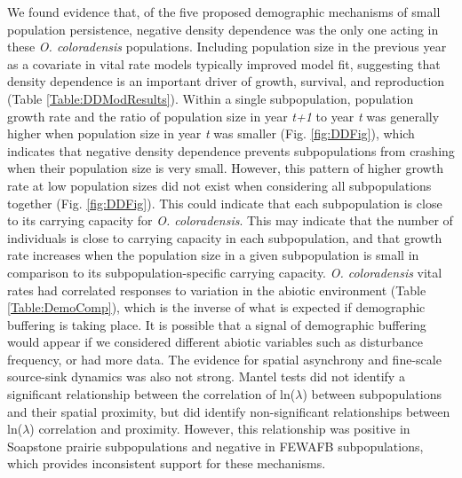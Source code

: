 \documentclass[12pt, letterpaper]{article}
\begin{document}
We found evidence that, of the five proposed demographic mechanisms of small population persistence, negative density dependence was the only one acting in these \textit{O. coloradensis} populations. Including population size in the previous year as a covariate in vital rate models typically improved model fit, suggesting that density dependence is an important driver of growth, survival, and reproduction (Table \ref{Table:DDModResults}). Within a single subpopulation, population growth rate and the ratio of population size in year \textit{t+1} to year \textit{t} was generally higher when population size in year \textit{t} was smaller (Fig. \ref{fig:DDFig}), which indicates that negative density dependence prevents subpopulations from crashing when their population size is very small.  However, this pattern of higher growth rate at low population sizes did not exist when considering all subpopulations together (Fig. \ref{fig:DDFig}). This could indicate that each subpopulation is close to its carrying capacity for \textit{O. coloradensis}. This may indicate that the number of individuals is close to carrying capacity in each subpopulation, and that growth rate increases when the population size in a given subpopulation is small in comparison to its subpopulation-specific carrying capacity. \textit{O. coloradensis} vital rates had correlated responses to variation in the abiotic environment (Table \ref{Table:DemoComp}), which is the inverse of what is expected if demographic buffering is taking place. It is possible that a signal of demographic buffering would appear if we considered different abiotic variables such as disturbance frequency, or had more data. 
The evidence for spatial asynchrony and fine-scale source-sink dynamics was also not strong. Mantel tests did not identify a significant relationship between the correlation of ln($\lambda$) between subpopulations and their spatial proximity, but did identify non-significant relationships between ln($\lambda$) correlation and proximity. However, this relationship was positive in Soapstone prairie subpopulations and negative in FEWAFB subpopulations, which provides inconsistent support for these mechanisms.  
\end{document}

